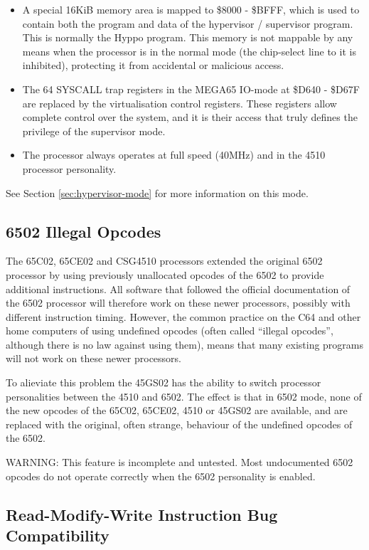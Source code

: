 \begin{itemize}
\item A special 16KiB memory area is mapped to \$8000 - \$BFFF, which is used to contain both
  the program and data of the hypervisor / supervisor program.  This is normally the Hyppo program.
  This memory is not mappable by any means when the processor is in the normal mode (the chip-select
  line to it is inhibited), protecting it from accidental or malicious access.
\item The 64 SYSCALL trap registers in the MEGA65 IO-mode at \$D640 - \$D67F are replaced by the
  virtualisation control registers.  These registers allow complete control over the system, and
  it is their access that truly defines the privilege of the supervisor mode.
  \item The processor always operates at full speed (40MHz) and in the 4510 processor personality.
\end{itemize}

See Section \ref{sec:hypervisor-mode} for more information on this mode.

\subsection{6502 Illegal Opcodes}

The 65C02, 65CE02 and CSG4510 processors extended the original 6502 processor
by using previously unallocated opcodes of the 6502 to provide additional
instructions.  All software that followed the official documentation of the 6502
processor will therefore work on these newer processors, possibly with different
instruction timing.  However, the common practice on the C64 and other home computers
of using undefined opcodes (often called ``illegal opcodes'', although there is no
law against using them), means that many existing programs will not work on these
newer processors.

To alieviate this problem the 45GS02 has the ability to switch processor personalities
between the 4510 and 6502.  The effect is that in 6502 mode, none of the new opcodes of
the 65C02, 65CE02, 4510 or 45GS02 are available, and are replaced with the original,
often strange, behaviour of the undefined opcodes of the 6502.

WARNING: This feature is incomplete and untested.  Most undocumented 6502 opcodes do not operate correctly when the 6502
personality is enabled.

\subsection{Read-Modify-Write Instruction Bug Compatibility}

